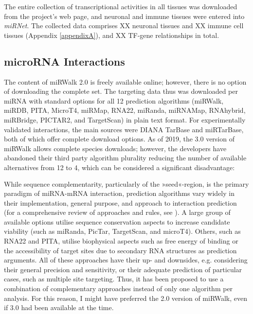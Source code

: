 The entire collection of transcriptional activities in all tissues was downloaded from the project's web page\cite{Marbach2016}, and neuronal and immune tissues were entered into \textit{miRNet}. The collected data comprises XX neuronal tissues and XX immune cell tissues (Appendix \ref{appendixA}), and XX TF-gene relationships in total. 

\subsection{microRNA Interactions} \label{database:miRNA}
The content of miRWalk 2.0 is freely available online\cite{miRWalk2}; however, there is no option of downloading the complete set. The targeting data thus was downloaded per miRNA with standard options for all 12 prediction algorithms (miRWalk, miRDB, PITA, MicroT4, miRMap, RNA22, miRanda, miRNAMap, RNAhybrid, miRBridge, PICTAR2, and TargetScan) in plain text format. For experimentally validated interactions, the main sources were DIANA TarBase\cite{Karagkouni2018} and miRTarBase\cite{Chou2018}, both of which offer complete download options. As of 2019, the 3.0 version of miRWalk allows complete species downloads; however, the developers have abandoned their third party algorithm plurality reducing the number of available alternatives from 12 to 4, which can be considered a significant disadvantage:

While sequence complementarity, particularly of the »seed«-region, is the primary paradigm of miRNA-mRNA interaction, prediction algorithms vary widely in their implementation, general purpose, and approach to interaction prediction (for a comprehensive review of approaches and rules, see \cite{Yue2009}). A large group of available options utilise sequence conservation aspects to increase candidate viability (such as miRanda, PicTar, TargetScan, and microT4). Others, such as RNA22 and PITA, utilise biophysical aspects such as free energy of binding or the accessibility of target sites due to secondary RNA structures as prediction arguments. All of these approaches have their up- and downsides, e.g. considering their general precision and sensitivity, or their adequate prediction of particular cases, such as multiple site targeting. Thus, it has been proposed to use a combination of complementary approaches instead of only one algorithm per analysis\cite{Witkos2011}. For this reason, I might have preferred the 2.0 version of miRWalk, even if 3.0 had been available at the time.

